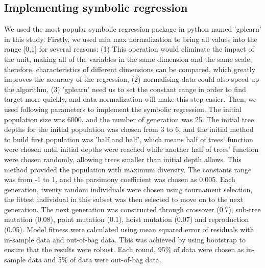 \documentclass[11pt,a4paper]{article}
\begin{document}
\subsection{Implementing symbolic regression}
We used the most popular symbolic regression package in python named 'gplearn' in this study. Firstly, we used min max normalization to bring all values into the range [0,1] for several reasons: (1) This operation would eliminate the impact of the unit, making all of the variables in the same dimension and the same scale, therefore,
characteristics of different dimensions can be compared, which greatly improves the accuracy of the regression, (2) normalising data could also speed up the algorithm, (3) 'gplearn' need us to set the constant range in order to find target more quickly, and data normalization will make this step easier. Then, we used following parameters to implement the symbolic regression. The initial population size was 6000, and the number of generation was 25. The initial tree depths for the initial population was chosen from 3 to 6, and the initial method to build first population was 'half and half', which means half of trees‘ function were chosen until initial depths were reached while another half of trees’ function were chosen randomly, allowing trees smaller than initial depth allows. This method provided the population with maximum diversity. The constants range was from -1 to 1, and the parsimony coefficient was chosen as 0.005. Each generation, twenty random individuals were chosen using tournament selection, the fittest individual in this subset was then selected to move on to the next generation. The next generation was constructed through crossover (0.7), sub-tree mutation (0.08), point mutation (0.1), hoist mutation (0.07) and reproduction (0.05). Model fitness were calculated using mean squared error of residuals with in-sample data and out-of-bag data. This was achieved by using bootstrap \citep{Efron} to ensure that the results were robust. Each round, 95\% of data were chosen as in-sample data and 5\% of data were out-of-bag data. 
\end{document}
